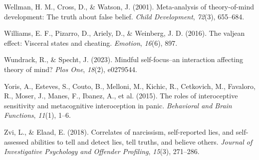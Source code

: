 \documentclass[
  man,mask,floatsintext]{apa6}
\newlength{\cslhangindent}
\newlength{\cslentryspacingunit} %
\newenvironment{CSLReferences}[2] %
 {%
  \setlength{\parindent}{0pt}
  \ifodd #1
  \let\oldpar\par
  \def\par{\hangindent=\cslhangindent\oldpar}
  \fi
  \setlength{\parskip}{#2\cslentryspacingunit}
 }%
 {}
\begin{document}
\begin{CSLReferences}{1}{0}
\leavevmode{}%
Wellman, H. M., Cross, D., \& Watson, J. (2001). Meta-analysis of theory-of-mind development: The truth about false belief. \emph{Child Development}, \emph{72}(3), 655--684.

\leavevmode{}%
Williams, E. F., Pizarro, D., Ariely, D., \& Weinberg, J. D. (2016). The valjean effect: Visceral states and cheating. \emph{Emotion}, \emph{16}(6), 897.

\leavevmode{}%
Wundrack, R., \& Specht, J. (2023). Mindful self-focus--an interaction affecting theory of mind? \emph{Plos One}, \emph{18}(2), e0279544.

\leavevmode{}%
Yoris, A., Esteves, S., Couto, B., Melloni, M., Kichic, R., Cetkovich, M., Favaloro, R., Moser, J., Manes, F., Ibanez, A., et al. (2015). The roles of interoceptive sensitivity and metacognitive interoception in panic. \emph{Behavioral and Brain Functions}, \emph{11}(1), 1--6.

\leavevmode{}%
Zvi, L., \& Elaad, E. (2018). Correlates of narcissism, self-reported lies, and self-assessed abilities to tell and detect lies, tell truths, and believe others. \emph{Journal of Investigative Psychology and Offender Profiling}, \emph{15}(3), 271--286.

\end{CSLReferences}

\endgroup
\end{document}
